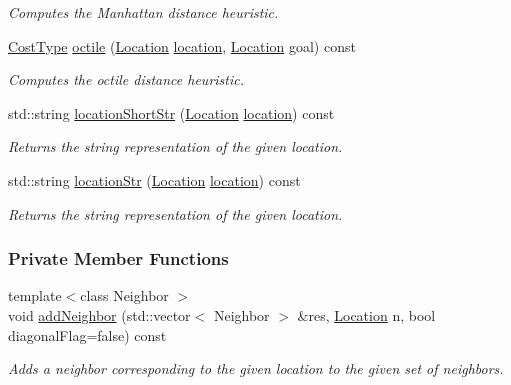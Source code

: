 \begin{DoxyCompactItemize}
\begin{DoxyCompactList}\small\item\em Computes the Manhattan distance heuristic. \end{DoxyCompactList}\item 
\hyperlink{structslb_1_1core_1_1sb_1_1GridMap_a7e34c6c6b867bb15e2062f5c9ae3458c}{Cost\+Type} \hyperlink{structslb_1_1core_1_1sb_1_1GridMap_a317a84378468f39ab5450de7eb29ef0d}{octile} (\hyperlink{structslb_1_1core_1_1sb_1_1GridMap_ad7f78dfb03ac219e9f9047c17996d9f5}{Location} \hyperlink{structslb_1_1core_1_1sb_1_1GridMap_aff0cbd3845da8e84f6f65c82285af135}{location}, \hyperlink{structslb_1_1core_1_1sb_1_1GridMap_ad7f78dfb03ac219e9f9047c17996d9f5}{Location} goal) const 
\begin{DoxyCompactList}\small\item\em Computes the octile distance heuristic. \end{DoxyCompactList}\item 
std\+::string \hyperlink{structslb_1_1core_1_1sb_1_1GridMap_a9cfb469ec32dd84b339f3ecf05339cdd}{location\+Short\+Str} (\hyperlink{structslb_1_1core_1_1sb_1_1GridMap_ad7f78dfb03ac219e9f9047c17996d9f5}{Location} \hyperlink{structslb_1_1core_1_1sb_1_1GridMap_aff0cbd3845da8e84f6f65c82285af135}{location}) const 
\begin{DoxyCompactList}\small\item\em Returns the string representation of the given location. \end{DoxyCompactList}\item 
std\+::string \hyperlink{structslb_1_1core_1_1sb_1_1GridMap_acaeba8512098541db61ed0c3cb36c0a5}{location\+Str} (\hyperlink{structslb_1_1core_1_1sb_1_1GridMap_ad7f78dfb03ac219e9f9047c17996d9f5}{Location} \hyperlink{structslb_1_1core_1_1sb_1_1GridMap_aff0cbd3845da8e84f6f65c82285af135}{location}) const 
\begin{DoxyCompactList}\small\item\em Returns the string representation of the given location. \end{DoxyCompactList}\end{DoxyCompactItemize}
\subsubsection*{Private Member Functions}
\begin{DoxyCompactItemize}
\item 
{\footnotesize template$<$class Neighbor $>$ }\\void \hyperlink{structslb_1_1core_1_1sb_1_1GridMap_a6ce65b56e3b50be31600ec13f012b8ab}{add\+Neighbor} (std\+::vector$<$ Neighbor $>$ \&res, \hyperlink{structslb_1_1core_1_1sb_1_1GridMap_ad7f78dfb03ac219e9f9047c17996d9f5}{Location} n, bool diagonal\+Flag=false) const 
\begin{DoxyCompactList}\small\item\em Adds a neighbor corresponding to the given location to the given set of neighbors. \end{DoxyCompactList}\end{DoxyCompactItemize}
